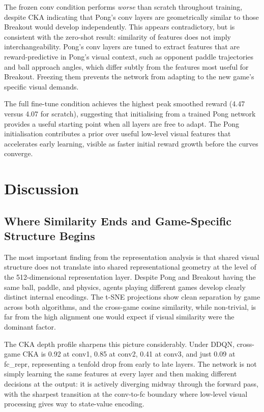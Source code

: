 \documentclass[a4paper]{article}
\begin{document}
The frozen conv condition performs \textit{worse} than scratch throughout training, despite CKA indicating that Pong's conv layers are geometrically similar to those Breakout would develop independently. This appears contradictory, but is consistent with the zero-shot result: similarity of features does not imply interchangeability. Pong's conv layers are tuned to extract features that are reward-predictive in Pong's visual context, such as opponent paddle trajectories and ball approach angles, which differ subtly from the features most useful for Breakout. Freezing them prevents the network from adapting to the new game's specific visual demands.

The full fine-tune condition achieves the highest peak smoothed reward (4.47 versus 4.07 for scratch), suggesting that initialising from a trained Pong network provides a useful starting point when all layers are free to adapt. The Pong initialisation contributes a prior over useful low-level visual features that accelerates early learning, visible as faster initial reward growth before the curves converge.

\section{Discussion}
\label{sec:analysis}

\subsection{Where Similarity Ends and Game-Specific Structure Begins}

The most important finding from the representation analysis is that shared visual structure does not translate into shared representational geometry at the level of the 512-dimensional representation layer. Despite Pong and Breakout having the same ball, paddle, and physics, agents playing different games develop clearly distinct internal encodings. The t-SNE projections show clean separation by game across both algorithms, and the cross-game cosine similarity, while non-trivial, is far from the high alignment one would expect if visual similarity were the dominant factor.

The CKA depth profile sharpens this picture considerably. Under DDQN, cross-game CKA is 0.92 at conv1, 0.85 at conv2, 0.41 at conv3, and just 0.09 at fc\_repr, representing a tenfold drop from early to late layers. The network is not simply learning the same features at every layer and then making different decisions at the output: it is actively diverging midway through the forward pass, with the sharpest transition at the conv-to-fc boundary where low-level visual processing gives way to state-value encoding.
\end{document}
